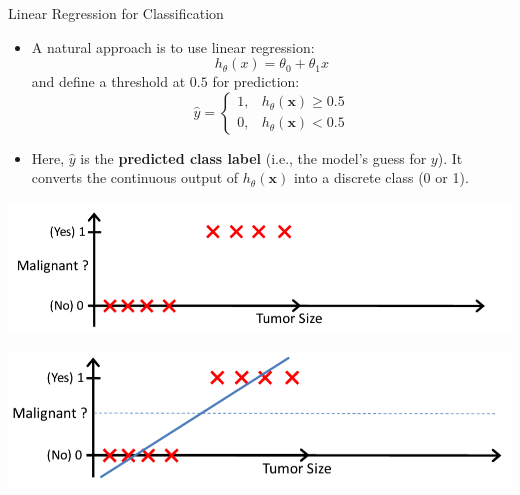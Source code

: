 \documentclass[serif, aspectratio=169]{beamer}
\begin{document}
\begin{frame}{Linear Regression for Classification}
    \begin{itemize}
        \item A natural approach is to use linear regression:
        \[
            h_\theta(x) = \theta_0 + \theta_1 x
        \]
        and define a threshold at $0.5$ for prediction:
        \[
            \hat{y} =
            \begin{cases}
                1, & h_\theta(\mathbf{x}) \ge 0.5\\
                0, & h_\theta(\mathbf{x}) < 0.5
            \end{cases}
        \]
    \item Here, $\hat{y}$ is the \textbf{predicted class label} (i.e., the model's guess for $y$). It converts the continuous output of $h_\theta(\mathbf{x})$ into a discrete class (0 or 1).
    \end{itemize}

    \vspace{0.5em}
    \begin{minipage}{0.48\linewidth}
        \centering
        \includegraphics[width=\linewidth]{pic/lrClassification1.png}
    \end{minipage}
    \hfill
    \begin{minipage}{0.48\linewidth}
        \centering
        \includegraphics[width=\linewidth]{pic/lrClassification3.png}
    \end{minipage}
\end{frame}
\end{document}
